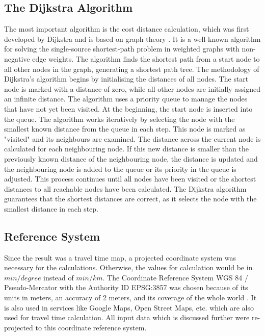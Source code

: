 \documentclass[11pt, a4paper]{report}
\begin{document}
\subsection{The Dijkstra Algorithm}
The most important algorithm is the cost distance calculation, which was first developed by Dijkstra and is based on graph theory \citep{dijkstra_note_1959}. It is a well-known algorithm for solving the single-source shortest-path problem in weighted graphs with non-negative edge weights. The algorithm finds the shortest path from a start node to all other nodes in the graph, generating a shortest path tree.
The methodology of Dijkstra's algorithm begins by initialising the distances of all nodes. The start node is marked with a distance of zero, while all other nodes are initially assigned an infinite distance. The algorithm uses a priority queue to manage the nodes that have not yet been visited. At the beginning, the start node is inserted into the queue.
The algorithm works iteratively by selecting the node with the smallest known distance from the queue in each step. This node is marked as "visited" and its neighbours are examined. The distance across the current node is calculated for each neighbouring node. If this new distance is smaller than the previously known distance of the neighbouring node, the distance is updated and the neighbouring node is added to the queue or its priority in the queue is adjusted.
This process continues until all nodes have been visited or the shortest distances to all reachable nodes have been calculated. The Dijkstra algorithm guarantees that the shortest distances are correct, as it selects the node with the smallest distance in each step.

\subsection{Reference System}
Since the result was a travel time map, a projected coordinate system was necessary for the calculations. Otherwise, the values for calculation would be in $min/degree$ instead of $min/km$. The Coordinate Reference System WGS 84 / Pseudo-Mercator with the Authority ID EPSG:3857 was chosen because of its units in meters, an accuracy of 2 meters, and its coverage of the whole world \citep{international_association_of_oil__gas_producers_iogp_epsg_2024}. It is also used in services like Google Maps, Open Street Maps, etc. which are also used for travel time calculation. All input data which is discussed further were re-projected to this coordinate reference system. 
\end{document}
